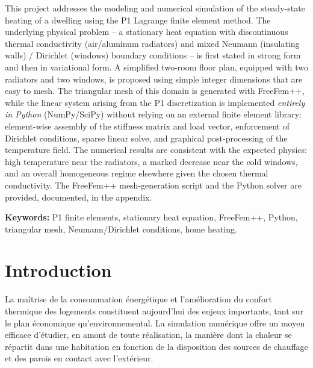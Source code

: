 \documentclass[12pt,a4paper]{article}
\begin{document}
	This project addresses the modeling and numerical simulation of the steady-state heating of a dwelling using the P1 Lagrange finite element method. The underlying physical problem -- a stationary heat equation with discontinuous thermal conductivity (air/aluminum radiators) and mixed Neumann (insulating walls) / Dirichlet (windows) boundary conditions -- is first stated in strong form and then in variational form. A simplified two-room floor plan, equipped with two radiators and two windows, is proposed using simple integer dimensions that are easy to mesh. The triangular mesh of this domain is generated with FreeFem++, while the linear system arising from the P1 discretization is implemented \emph{entirely in Python} (NumPy/SciPy) without relying on an external finite element library: element-wise assembly of the stiffness matrix and load vector, enforcement of Dirichlet conditions, sparse linear solve, and graphical post-processing of the temperature field. The numerical results are consistent with the expected physics: high temperature near the radiators, a marked decrease near the cold windows, and an overall homogeneous regime elsewhere given the chosen thermal conductivity. The FreeFem++ mesh-generation script and the Python solver are provided, documented, in the appendix.
	
	\vspace{0.4cm}
	\noindent\textbf{Keywords:} P1 finite elements, stationary heat equation, FreeFem++, Python, triangular mesh, Neumann/Dirichlet conditions, home heating.
	
	\tableofcontents
	\listoffigures
	\listoftables
	\newpage
	
	\section*{Introduction}
	
	La maîtrise de la consommation énergétique et l'amélioration du confort thermique des logements constituent aujourd'hui des enjeux importants, tant sur le plan économique qu'environnemental. La simulation numérique offre un moyen efficace d'étudier, en amont de toute réalisation, la manière dont la chaleur se répartit dans une habitation en fonction de la disposition des sources de chauffage et des parois en contact avec l'extérieur.
	
\end{document}
